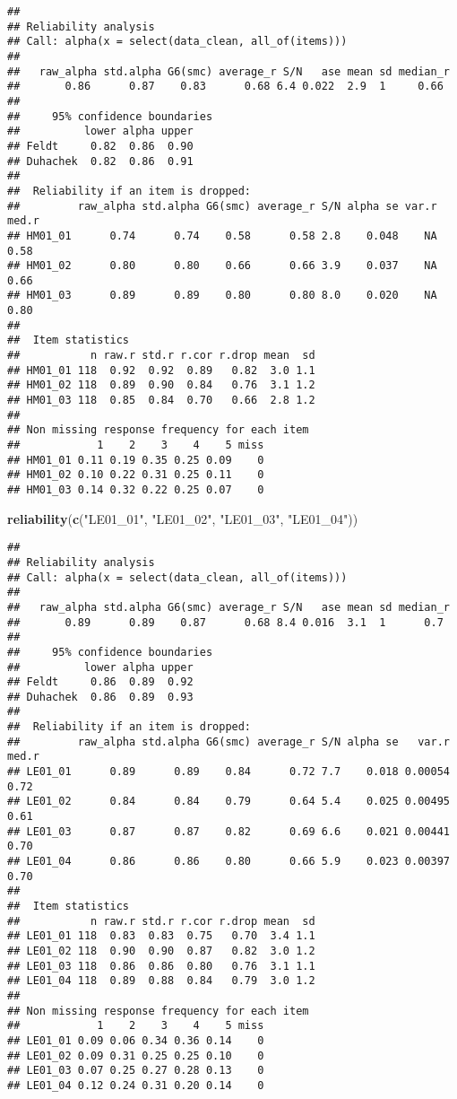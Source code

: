 \documentclass[
]{article}
\newenvironment{Shaded}{\begin{snugshade}}{\end{snugshade}}
\newcommand{\FunctionTok}[1]{\textcolor[rgb]{0.13,0.29,0.53}{\textbf{#1}}}
\newcommand{\NormalTok}[1]{#1}
\newcommand{\StringTok}[1]{\textcolor[rgb]{0.31,0.60,0.02}{#1}}
\begin{document}
\begin{verbatim}
## 
## Reliability analysis   
## Call: alpha(x = select(data_clean, all_of(items)))
## 
##   raw_alpha std.alpha G6(smc) average_r S/N   ase mean sd median_r
##       0.86      0.87    0.83      0.68 6.4 0.022  2.9  1     0.66
## 
##     95% confidence boundaries 
##          lower alpha upper
## Feldt     0.82  0.86  0.90
## Duhachek  0.82  0.86  0.91
## 
##  Reliability if an item is dropped:
##         raw_alpha std.alpha G6(smc) average_r S/N alpha se var.r med.r
## HM01_01      0.74      0.74    0.58      0.58 2.8    0.048    NA  0.58
## HM01_02      0.80      0.80    0.66      0.66 3.9    0.037    NA  0.66
## HM01_03      0.89      0.89    0.80      0.80 8.0    0.020    NA  0.80
## 
##  Item statistics 
##           n raw.r std.r r.cor r.drop mean  sd
## HM01_01 118  0.92  0.92  0.89   0.82  3.0 1.1
## HM01_02 118  0.89  0.90  0.84   0.76  3.1 1.2
## HM01_03 118  0.85  0.84  0.70   0.66  2.8 1.2
## 
## Non missing response frequency for each item
##            1    2    3    4    5 miss
## HM01_01 0.11 0.19 0.35 0.25 0.09    0
## HM01_02 0.10 0.22 0.31 0.25 0.11    0
## HM01_03 0.14 0.32 0.22 0.25 0.07    0
\end{verbatim}

\begin{Shaded}
\begin{Highlighting}[]
\FunctionTok{reliability}\NormalTok{(}\FunctionTok{c}\NormalTok{(}\StringTok{"LE01\_01"}\NormalTok{, }\StringTok{"LE01\_02"}\NormalTok{, }\StringTok{"LE01\_03"}\NormalTok{, }\StringTok{"LE01\_04"}\NormalTok{))}
\end{Highlighting}
\end{Shaded}

\begin{verbatim}
## 
## Reliability analysis   
## Call: alpha(x = select(data_clean, all_of(items)))
## 
##   raw_alpha std.alpha G6(smc) average_r S/N   ase mean sd median_r
##       0.89      0.89    0.87      0.68 8.4 0.016  3.1  1      0.7
## 
##     95% confidence boundaries 
##          lower alpha upper
## Feldt     0.86  0.89  0.92
## Duhachek  0.86  0.89  0.93
## 
##  Reliability if an item is dropped:
##         raw_alpha std.alpha G6(smc) average_r S/N alpha se   var.r med.r
## LE01_01      0.89      0.89    0.84      0.72 7.7    0.018 0.00054  0.72
## LE01_02      0.84      0.84    0.79      0.64 5.4    0.025 0.00495  0.61
## LE01_03      0.87      0.87    0.82      0.69 6.6    0.021 0.00441  0.70
## LE01_04      0.86      0.86    0.80      0.66 5.9    0.023 0.00397  0.70
## 
##  Item statistics 
##           n raw.r std.r r.cor r.drop mean  sd
## LE01_01 118  0.83  0.83  0.75   0.70  3.4 1.1
## LE01_02 118  0.90  0.90  0.87   0.82  3.0 1.2
## LE01_03 118  0.86  0.86  0.80   0.76  3.1 1.1
## LE01_04 118  0.89  0.88  0.84   0.79  3.0 1.2
## 
## Non missing response frequency for each item
##            1    2    3    4    5 miss
## LE01_01 0.09 0.06 0.34 0.36 0.14    0
## LE01_02 0.09 0.31 0.25 0.25 0.10    0
## LE01_03 0.07 0.25 0.27 0.28 0.13    0
## LE01_04 0.12 0.24 0.31 0.20 0.14    0
\end{verbatim}
\end{document}
